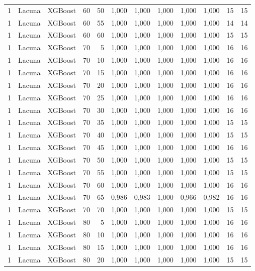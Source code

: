 \begin{longtable}{@{}rllrrrrrrrrr@{}}
1 & Lacuna & XGBoost & 60 & 50 & 1,000 & 1,000 & 1,000 & 1,000 & 1,000 & 15 & 15 \\
1 & Lacuna & XGBoost & 60 & 55 & 1,000 & 1,000 & 1,000 & 1,000 & 1,000 & 14 & 14 \\
1 & Lacuna & XGBoost & 60 & 60 & 1,000 & 1,000 & 1,000 & 1,000 & 1,000 & 15 & 15 \\
1 & Lacuna & XGBoost & 70 & 5 & 1,000 & 1,000 & 1,000 & 1,000 & 1,000 & 16 & 16 \\
1 & Lacuna & XGBoost & 70 & 10 & 1,000 & 1,000 & 1,000 & 1,000 & 1,000 & 16 & 16 \\
1 & Lacuna & XGBoost & 70 & 15 & 1,000 & 1,000 & 1,000 & 1,000 & 1,000 & 16 & 16 \\
1 & Lacuna & XGBoost & 70 & 20 & 1,000 & 1,000 & 1,000 & 1,000 & 1,000 & 16 & 16 \\
1 & Lacuna & XGBoost & 70 & 25 & 1,000 & 1,000 & 1,000 & 1,000 & 1,000 & 16 & 16 \\
1 & Lacuna & XGBoost & 70 & 30 & 1,000 & 1,000 & 1,000 & 1,000 & 1,000 & 16 & 16 \\
1 & Lacuna & XGBoost & 70 & 35 & 1,000 & 1,000 & 1,000 & 1,000 & 1,000 & 15 & 15 \\
1 & Lacuna & XGBoost & 70 & 40 & 1,000 & 1,000 & 1,000 & 1,000 & 1,000 & 15 & 15 \\
1 & Lacuna & XGBoost & 70 & 45 & 1,000 & 1,000 & 1,000 & 1,000 & 1,000 & 16 & 16 \\
1 & Lacuna & XGBoost & 70 & 50 & 1,000 & 1,000 & 1,000 & 1,000 & 1,000 & 15 & 15 \\
1 & Lacuna & XGBoost & 70 & 55 & 1,000 & 1,000 & 1,000 & 1,000 & 1,000 & 15 & 15 \\
1 & Lacuna & XGBoost & 70 & 60 & 1,000 & 1,000 & 1,000 & 1,000 & 1,000 & 16 & 16 \\
1 & Lacuna & XGBoost & 70 & 65 & 0,986 & 0,983 & 1,000 & 0,966 & 0,982 & 16 & 16 \\
1 & Lacuna & XGBoost & 70 & 70 & 1,000 & 1,000 & 1,000 & 1,000 & 1,000 & 15 & 15 \\
1 & Lacuna & XGBoost & 80 & 5 & 1,000 & 1,000 & 1,000 & 1,000 & 1,000 & 16 & 16 \\
1 & Lacuna & XGBoost & 80 & 10 & 1,000 & 1,000 & 1,000 & 1,000 & 1,000 & 16 & 16 \\
1 & Lacuna & XGBoost & 80 & 15 & 1,000 & 1,000 & 1,000 & 1,000 & 1,000 & 16 & 16 \\
1 & Lacuna & XGBoost & 80 & 20 & 1,000 & 1,000 & 1,000 & 1,000 & 1,000 & 15 & 15 \\

\end{longtable}
